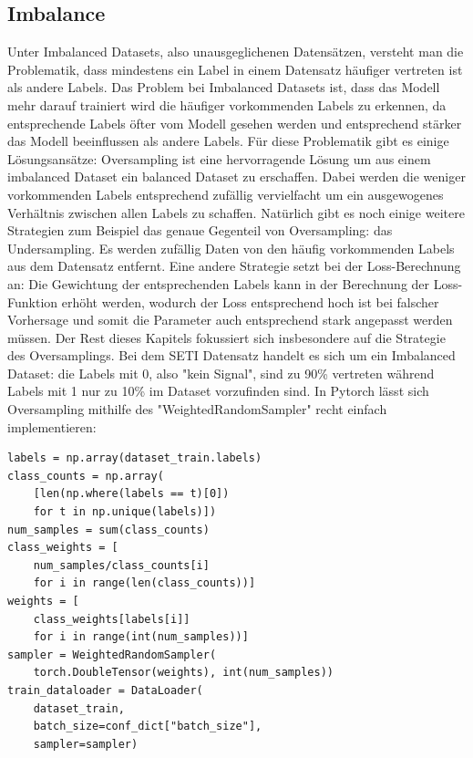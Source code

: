 \documentclass[12pt, a4paper]{article}
\begin{document}
\subsection{Imbalance}
Unter Imbalanced Datasets, also unausgeglichenen Datensätzen, versteht man die Problematik, dass mindestens ein Label in einem Datensatz häufiger vertreten ist als andere Labels. Das Problem bei Imbalanced Datasets ist, dass das Modell mehr darauf trainiert wird die häufiger vorkommenden Labels zu erkennen, da entsprechende Labels öfter vom Modell gesehen werden und entsprechend stärker das Modell beeinflussen als andere Labels. Für diese Problematik gibt es einige Lösungsansätze:
\newline
Oversampling ist eine hervorragende Lösung um aus einem imbalanced Dataset ein balanced Dataset zu erschaffen. Dabei werden die weniger vorkommenden Labels entsprechend zufällig vervielfacht um ein ausgewogenes Verhältnis zwischen allen Labels zu schaffen. Natürlich gibt es noch einige weitere Strategien zum Beispiel das genaue Gegenteil von Oversampling: das Undersampling. Es werden zufällig Daten von den häufig vorkommenden Labels aus dem Datensatz entfernt. Eine andere Strategie setzt bei der Loss-Berechnung an: Die Gewichtung der entsprechenden Labels kann in der Berechnung der Loss-Funktion erhöht werden, wodurch der Loss entsprechend hoch ist bei falscher Vorhersage und somit die Parameter auch entsprechend stark angepasst werden müssen. Der Rest dieses Kapitels fokussiert sich insbesondere auf die Strategie des Oversamplings.
\newline
Bei dem SETI Datensatz handelt es sich um ein Imbalanced Dataset: die Labels mit 0, also "kein Signal", sind zu 90\% vertreten während Labels mit 1 nur zu 10\% im Dataset vorzufinden sind. In Pytorch lässt sich Oversampling mithilfe des "WeightedRandomSampler" recht einfach implementieren:
\begin{lstlisting}
labels = np.array(dataset_train.labels)
class_counts = np.array(
	[len(np.where(labels == t)[0]) 
	for t in np.unique(labels)])
num_samples = sum(class_counts)
class_weights = [
	num_samples/class_counts[i] 
	for i in range(len(class_counts))]
weights = [
	class_weights[labels[i]] 
	for i in range(int(num_samples))]
sampler = WeightedRandomSampler(
	torch.DoubleTensor(weights), int(num_samples))
train_dataloader = DataLoader(
	dataset_train, 
	batch_size=conf_dict["batch_size"], 
	sampler=sampler)
\end{lstlisting}
\end{document}
